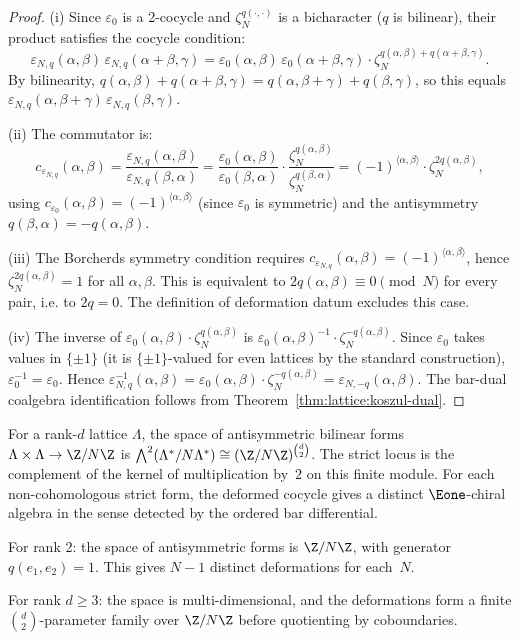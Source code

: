 \begin{proof}
(i) Since $\varepsilon_0$ is a 2-cocycle and $\zeta_N^{q(\cdot,\cdot)}$
is a bicharacter ($q$ is bilinear), their product satisfies the
cocycle condition:
\[
\varepsilon_{N,q}(\alpha,\beta)\,
\varepsilon_{N,q}(\alpha+\beta,\gamma)
= \varepsilon_0(\alpha,\beta)\,\varepsilon_0(\alpha+\beta,\gamma)
 \cdot \zeta_N^{q(\alpha,\beta) + q(\alpha+\beta,\gamma)}.
\]
By bilinearity, $q(\alpha,\beta) + q(\alpha+\beta,\gamma)
= q(\alpha,\beta+\gamma) + q(\beta,\gamma)$, so this equals
$\varepsilon_{N,q}(\alpha,\beta+\gamma)\,
\varepsilon_{N,q}(\beta,\gamma)$.

(ii) The commutator is:
\[
c_{\varepsilon_{N,q}}(\alpha,\beta)
= \frac{\varepsilon_{N,q}(\alpha,\beta)}%
 {\varepsilon_{N,q}(\beta,\alpha)}
= \frac{\varepsilon_0(\alpha,\beta)}%
 {\varepsilon_0(\beta,\alpha)}
 \cdot \frac{\zeta_N^{q(\alpha,\beta)}}%
 {\zeta_N^{q(\beta,\alpha)}}
= (-1)^{\langle\alpha,\beta\rangle}
 \cdot \zeta_N^{2q(\alpha,\beta)},
\]
using $c_{\varepsilon_0}(\alpha,\beta) =
(-1)^{\langle\alpha,\beta\rangle}$
(since $\varepsilon_0$ is symmetric) and the antisymmetry
$q(\beta,\alpha) = -q(\alpha,\beta)$.

(iii) The Borcherds symmetry condition requires
$c_{\varepsilon_{N,q}}(\alpha,\beta) =
(-1)^{\langle\alpha,\beta\rangle}$,
hence $\zeta_N^{2q(\alpha,\beta)} = 1$ for all $\alpha, \beta$.
This is equivalent to
$2q(\alpha,\beta)\equiv0\pmod N$ for every pair, i.e. to $2q=0$.
The definition of deformation datum excludes this case.

(iv) The inverse of $\varepsilon_0(\alpha,\beta) \cdot
\zeta_N^{q(\alpha,\beta)}$ is
$\varepsilon_0(\alpha,\beta)^{-1} \cdot
\zeta_N^{-q(\alpha,\beta)}$. Since $\varepsilon_0$ takes values in
$\{\pm 1\}$ (it is $\{\pm 1\}$-valued for even lattices by the
standard construction), $\varepsilon_0^{-1} = \varepsilon_0$. Hence
$\varepsilon_{N,q}^{-1}(\alpha,\beta) =
\varepsilon_0(\alpha,\beta) \cdot \zeta_N^{-q(\alpha,\beta)}
= \varepsilon_{N,-q}(\alpha,\beta)$.
The bar-dual coalgebra identification follows from
Theorem~\ref{thm:lattice:koszul-dual}.
\end{proof}

\begin{remark}
\label{rem:lattice:deformation-space}
For a rank-$d$ lattice $\Lambda$, the space of antisymmetric
bilinear forms $\Lambda \times \Lambda \to \Z/N\Z$ is
$\bigwedge^2(\Lambda^*/N\Lambda^*) \cong (\Z/N\Z)^{\binom{d}{2}}$.
The strict locus is the complement of the kernel of multiplication
by~$2$ on this finite module. For each non-cohomologous strict form,
the deformed cocycle gives a distinct $\Eone$-chiral algebra in the
sense detected by the ordered bar differential.

For rank 2: the space of antisymmetric forms is $\Z/N\Z$, with
generator $q(e_1, e_2) = 1$. This gives $N - 1$ distinct
deformations for each~$N$.

For rank $d \geq 3$: the space is multi-dimensional, and the
deformations form a finite $\binom d2$-parameter family over
$\Z/N\Z$ before quotienting by coboundaries.
\end{remark}


